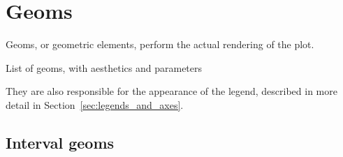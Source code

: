 % 
% 
% 
% 
% 
% 
% 
% 
% 



\section{Geoms}
\label{sec:geoms}

Geoms, or geometric elements, perform the actual rendering of the plot.

List of geoms, with aesthetics and parameters

They are also responsible for the appearance of the legend, described in more detail in Section~\ref{sec:legends_and_axes}.


\subsection{Interval geoms}
\label{sub:interval_geoms}


